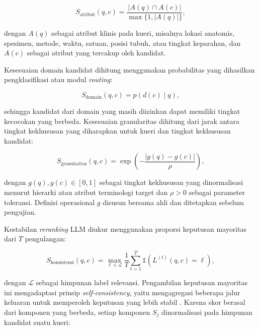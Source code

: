 \begin{equation}
S_{\mathrm{atribut}}(q,c)=
\frac{|A(q)\cap A(c)|}{\max\{1,|A(q)|\}},
\label{eq:attribute-coverage-score}
\end{equation}

dengan $A(q)$ sebagai atribut klinis pada kueri, misalnya lokasi anatomis, spesimen, metode, waktu, satuan, posisi tubuh, atau tingkat keparahan, dan $A(c)$ sebagai atribut yang tercakup oleh kandidat.

Kesesuaian domain kandidat dihitung menggunakan probabilitas yang dihasilkan pengklasifikasi atau modul \textit{routing}:

\begin{equation}
S_{\mathrm{domain}}(q,c)=p\!\left(d(c)\mid q\right),
\label{eq:domain-compatibility-score}
\end{equation}

sehingga kandidat dari domain yang masih diizinkan dapat memiliki tingkat kecocokan yang berbeda. Kesesuaian granularitas dihitung dari jarak antara tingkat kekhususan yang diharapkan untuk kueri dan tingkat kekhususan kandidat:

\begin{equation}
S_{\mathrm{granularitas}}(q,c)=
\exp\!\left(-\frac{|g(q)-g(c)|}{\rho}\right),
\label{eq:granularity-score}
\end{equation}

dengan $g(q),g(c)\in[0,1]$ sebagai tingkat kekhususan yang dinormalisasi menurut hierarki atau atribut terminologi target dan $\rho>0$ sebagai parameter toleransi. Definisi operasional $g$ disusun bersama ahli dan ditetapkan sebelum pengujian.

Kestabilan \textit{reranking} LLM diukur menggunakan proporsi keputusan mayoritas dari $T$ pengulangan:

\begin{equation}
S_{\mathrm{konsistensi}}(q,c)=
\max_{\ell\in\mathcal{L}}
\frac{1}{T}\sum_{t=1}^{T}
\mathbb{1}\!\left(L^{(t)}(q,c)=\ell\right),
\label{eq:reranking-self-consistency}
\end{equation}

dengan $\mathcal{L}$ sebagai himpunan label relevansi. Pengambilan keputusan mayoritas ini mengadaptasi prinsip \textit{self-consistency}, yaitu mengagregasi beberapa jalur keluaran untuk memperoleh keputusan yang lebih stabil \citep{wang_self-consistency_2023}. Karena skor berasal dari komponen yang berbeda, setiap komponen $S_j$ dinormalisasi pada himpunan kandidat suatu kueri:

